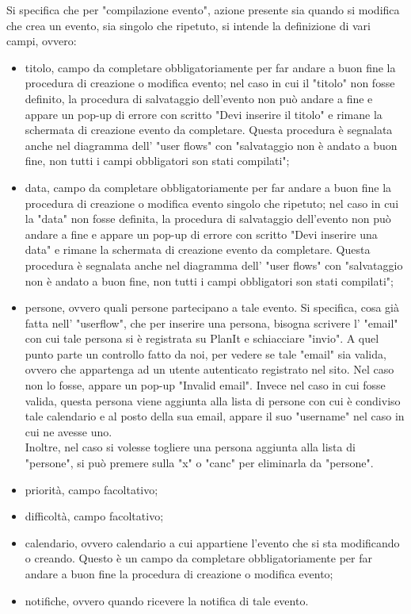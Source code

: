 Si specifica che per "compilazione evento", azione presente sia quando si modifica che crea un evento, sia singolo che ripetuto, si intende la definizione di vari campi, ovvero:
\begin{itemize}
    \item titolo, campo da completare obbligatoriamente per far andare a buon fine la procedura di creazione o modifica evento; nel caso in cui il "titolo" non fosse definito, la procedura di salvataggio dell'evento non può andare a fine e appare un pop-up di errore con scritto "Devi inserire il titolo" e rimane la schermata di creazione evento da completare. Questa procedura è segnalata anche nel diagramma dell' "user flows" con "salvataggio non è andato a buon fine, non tutti i campi obbligatori son stati compilati";
    \item data, campo da completare obbligatoriamente per far andare a buon fine la procedura di creazione o modifica evento singolo che ripetuto; nel caso in cui la "data" non fosse definita, la procedura di salvataggio dell'evento non può andare a fine e appare un pop-up di errore con scritto "Devi inserire una data" e rimane la schermata di creazione evento da completare. Questa procedura è segnalata anche nel diagramma dell' "user flows" con "salvataggio non è andato a buon fine, non tutti i campi obbligatori son stati compilati";
    \item persone, ovvero quali persone partecipano a tale evento. Si specifica, cosa già fatta nell' "userflow", che per inserire una persona, bisogna scrivere l' "email" con cui tale persona si è registrata su PlanIt e schiacciare "invio". A quel punto parte un controllo fatto da noi, per vedere se tale "email" sia valida, ovvero che appartenga ad un utente autenticato registrato nel sito. Nel caso non lo fosse, appare un pop-up "Invalid email". Invece nel caso in cui fosse valida, questa persona viene aggiunta alla lista di persone con cui è condiviso tale calendario e al posto della sua email, appare il suo "username" nel caso in cui ne avesse uno. \\
          Inoltre, nel caso si volesse togliere una persona aggiunta alla lista di "persone", si può premere sulla "x" o "canc" per eliminarla da "persone".
    \item priorità, campo facoltativo;
    \item difficoltà, campo facoltativo;
    \item calendario, ovvero calendario a cui appartiene l'evento che si sta modificando o creando. Questo è un campo da completare obbligatoriamente per far andare a buon fine la procedura di creazione o modifica evento;
    \item notifiche, ovvero quando ricevere la notifica di tale evento.
\end{itemize}
